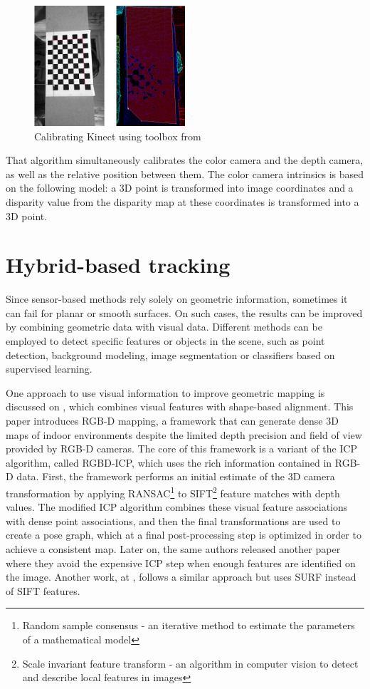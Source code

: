 \documentclass[msc, a4paper, classic, en]{ufbathesis}
\begin{document}
\begin{figure}
\centering
\includegraphics[width=0.5\textwidth]{images/herrera.png}
\caption{Calibrating Kinect using toolbox from \cite{herrera}}
\label{fig:herrera}
\end{figure}

That algorithm simultaneously calibrates the color camera and the depth camera, as well as the relative position between them. The color camera intrinsics is based on the following model: a 3D point is transformed into image coordinates and a disparity value from the disparity map at these coordinates is transformed into a 3D point.

\section{Hybrid-based tracking}

Since sensor-based methods rely solely on geometric information, sometimes it can fail for planar or smooth surfaces. On such cases, the results can be improved by combining geometric data with visual data. Different methods can be employed to detect specific features or objects in the scene, such as point detection, background modeling, image segmentation or classifiers based on supervised learning.

One approach to use visual information to improve geometric mapping is discussed on \cite{Hen10RGB}, which combines visual features with shape-based alignment. This paper introduces RGB-D mapping, a framework that can generate dense 3D maps of indoor environments despite the limited depth precision and field of view provided by RGB-D cameras. The core of this framework is a variant of the ICP algorithm, called RGBD-ICP, which uses the rich information contained in RGB-D data. First, the framework performs an initial estimate of the 3D camera transformation by applying RANSAC\footnote{Random sample consensus - an iterative method to estimate the parameters of a mathematical model} to SIFT\footnote{Scale invariant feature transform - an algorithm in computer vision to detect and describe local features in images} feature matches with depth values. The modified ICP algorithm combines these visual feature associations with dense point associations, and then the final transformations are used to create a pose graph, which at a final post-processing step is optimized in order to achieve a consistent map. Later on, the same authors released another paper \cite{Hen12RGB} where they avoid the expensive ICP step when enough features are identified on the image. Another work, at \cite{Engelhard11real-time3-d}, follows a similar approach but uses SURF \cite{bay} instead of SIFT features.
\end{document}
